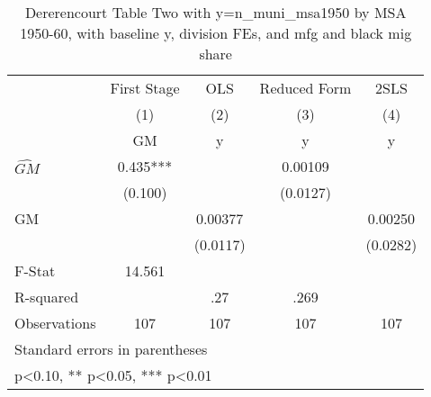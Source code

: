 \begin{table}[htbp]\centering
\def\sym#1{\ifmmode^{#1}\else\(^{#1}\)\fi}
\caption{Dererencourt Table Two with y=n\_muni\_msa1950 by MSA 1950-60, with baseline y, division FEs, and mfg and black mig share}
\begin{tabular}{l*{4}{c}}
\toprule
                    & First Stage   &         OLS   &Reduced Form   &        2SLS   \\
                    &\multicolumn{1}{c}{(1)}&\multicolumn{1}{c}{(2)}&\multicolumn{1}{c}{(3)}&\multicolumn{1}{c}{(4)}\\
                    &\multicolumn{1}{c}{GM}&\multicolumn{1}{c}{y}&\multicolumn{1}{c}{y}&\multicolumn{1}{c}{y}\\
\midrule
$\hat{GM}$          &       0.435***&               &     0.00109   &               \\
                    &     (0.100)   &               &    (0.0127)   &               \\
\addlinespace
GM                  &               &     0.00377   &               &     0.00250   \\
                    &               &    (0.0117)   &               &    (0.0282)   \\
\midrule
F-Stat              &      14.561   &               &               &               \\
R-squared           &               &         .27   &        .269   &               \\
Observations        &         107   &         107   &         107   &         107   \\
\bottomrule
\multicolumn{5}{l}{\footnotesize Standard errors in parentheses}\\
\multicolumn{5}{l}{\footnotesize * p<0.10, ** p<0.05, *** p<0.01}\\
\end{tabular}
\end{table}
